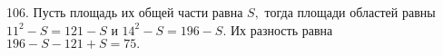 106. Пусть площадь их общей части равна $S,$ тогда площади областей равны $11^2-S=121-S$ и $14^2-S=196-S.$ Их разность равна $196-S-121+S=75.$\\
